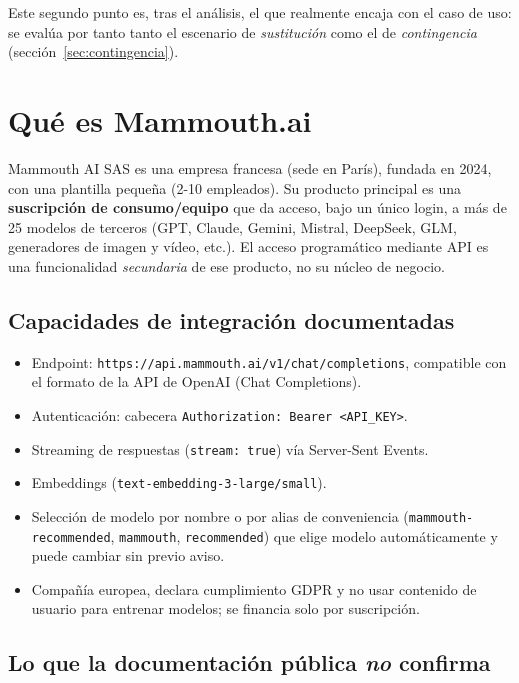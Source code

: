 \documentclass[11pt,a4paper]{article}
\begin{document}
Este segundo punto es, tras el análisis, el que realmente encaja con el caso de
uso: se evalúa por tanto tanto el escenario de \emph{sustitución} como el de
\emph{contingencia} (sección~\ref{sec:contingencia}).

\section{Qué es Mammouth.ai}

Mammouth AI SAS es una empresa francesa (sede en París), fundada en 2024, con una
plantilla pequeña (2-10 empleados). Su producto principal es una
\textbf{suscripción de consumo/equipo} que da acceso, bajo un único login, a
más de 25 modelos de terceros (GPT, Claude, Gemini, Mistral, DeepSeek, GLM,
generadores de imagen y vídeo, etc.). El acceso programático mediante API es una
funcionalidad \emph{secundaria} de ese producto, no su núcleo de negocio.

\subsection{Capacidades de integración documentadas}

\begin{itemize}
    \item Endpoint: \texttt{https://api.mammouth.ai/v1/chat/completions}, compatible
    con el formato de la API de OpenAI (Chat Completions).
    \item Autenticación: cabecera \texttt{Authorization: Bearer <API\_KEY>}.
    \item Streaming de respuestas (\texttt{stream: true}) vía Server-Sent Events.
    \item Embeddings (\texttt{text-embedding-3-large/small}).
    \item Selección de modelo por nombre o por alias de conveniencia
    (\texttt{mammouth-recommended}, \texttt{mammouth}, \texttt{recommended}) que
    elige modelo automáticamente y puede cambiar sin previo aviso.
    \item Compañía europea, declara cumplimiento GDPR y no usar contenido de
    usuario para entrenar modelos; se financia solo por suscripción.
\end{itemize}

\subsection{Lo que la documentación pública \emph{no} confirma}
\end{document}
